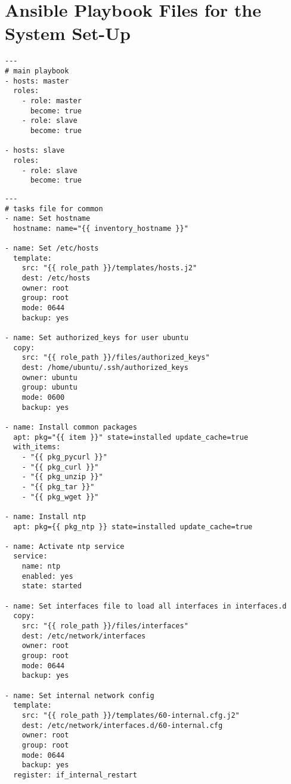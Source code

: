 
\chapter{Ansible Playbook Files for the System Set-Up}
\label{app:ansible}

\lstset{language=sh}
\begin{lstlisting}[caption={Ansible playbook that gets run to install the cluster system}, label={lst:ansibleall}]
---
# main playbook
- hosts: master
  roles:
    - role: master
      become: true
    - role: slave
      become: true

- hosts: slave
  roles:
    - role: slave
      become: true
\end{lstlisting}

\lstset{language=sh}
\begin{lstlisting}[caption={Common tasks in Ansible}, label={lst:ansiblecommon}]
---
# tasks file for common
- name: Set hostname
  hostname: name="{{ inventory_hostname }}"

- name: Set /etc/hosts
  template:
    src: "{{ role_path }}/templates/hosts.j2"
    dest: /etc/hosts
    owner: root
    group: root
    mode: 0644
    backup: yes

- name: Set authorized_keys for user ubuntu
  copy:
    src: "{{ role_path }}/files/authorized_keys"
    dest: /home/ubuntu/.ssh/authorized_keys
    owner: ubuntu
    group: ubuntu
    mode: 0600
    backup: yes

- name: Install common packages
  apt: pkg="{{ item }}" state=installed update_cache=true
  with_items:
    - "{{ pkg_pycurl }}"
    - "{{ pkg_curl }}"
    - "{{ pkg_unzip }}"
    - "{{ pkg_tar }}"
    - "{{ pkg_wget }}"

- name: Install ntp
  apt: pkg={{ pkg_ntp }} state=installed update_cache=true

- name: Activate ntp service
  service:
    name: ntp
    enabled: yes
    state: started

- name: Set interfaces file to load all interfaces in interfaces.d
  copy:
    src: "{{ role_path }}/files/interfaces"
    dest: /etc/network/interfaces
    owner: root
    group: root
    mode: 0644
    backup: yes

- name: Set internal network config
  template:
    src: "{{ role_path }}/templates/60-internal.cfg.j2"
    dest: /etc/network/interfaces.d/60-internal.cfg
    owner: root
    group: root
    mode: 0644
    backup: yes
  register: if_internal_restart


\end{lstlisting}

